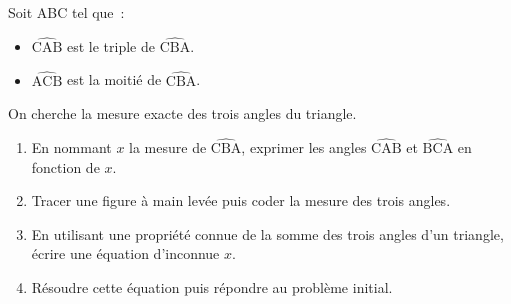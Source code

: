 \documentclass[exercice]{thedocument}%
\begin{document}
%
Soit ABC tel que~:
\begin{itemize}
    \item $\widehat{\text{CAB}}$ est le triple de $\widehat{\text{CBA}}$.
    \item $\widehat{\text{ACB}}$ est la moitié de $\widehat{\text{CBA}}$.
\end{itemize}
On cherche la mesure exacte des trois angles du triangle.
\begin{enumerate}
    \item En nommant $x$ la mesure de $\widehat{\text{CBA}}$, exprimer les
    angles $\widehat{\text{CAB}}$ et $\widehat{\text{BCA}}$ en fonction de $x$.
    \item Tracer une figure à main levée puis coder la mesure des trois angles.
    \item En utilisant une propriété connue de la somme des trois angles d'un triangle,
    écrire une équation d'inconnue $x$.
    \item Résoudre cette équation puis répondre au problème initial.
\end{enumerate}
\end{document}
